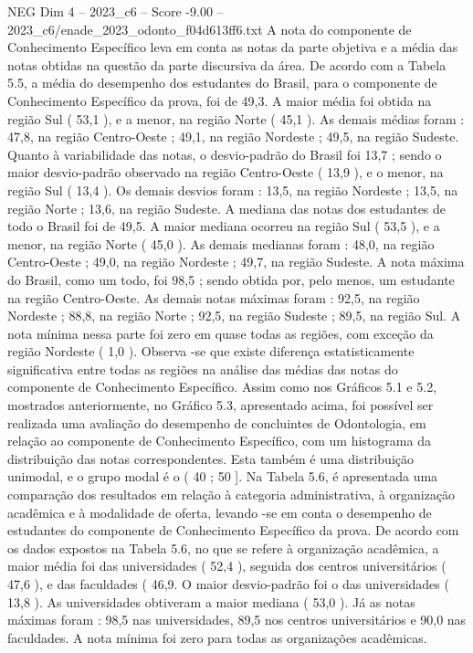 \begin{textsample}{NEG Dim 4 – 2023\_c6 – Score -9.00 – 2023\_c6/enade\_2023\_odonto\_f04d613ff6.txt}
A nota do componente de Conhecimento Específico leva em conta as notas da parte objetiva e a média das notas obtidas na questão da parte discursiva da área.
De acordo com a Tabela 5.5, a média do desempenho dos estudantes do Brasil, para o componente de Conhecimento Específico da prova, foi de 49,3.
A maior média foi obtida na região Sul ( 53,1 ), e a menor, na região Norte ( 45,1 ).
As demais médias foram : 47,8, na região Centro-Oeste ; 49,1, na região Nordeste ; 49,5, na região Sudeste.
Quanto à variabilidade das notas, o desvio-padrão do Brasil foi 13,7 ; sendo o maior desvio-padrão observado na região Centro-Oeste ( 13,9 ), e o menor, na região Sul ( 13,4 ).
Os demais desvios foram : 13,5, na região Nordeste ; 13,5, na região Norte ; 13,6, na região Sudeste.
A mediana das notas dos estudantes de todo o Brasil foi de 49,5.
A maior mediana ocorreu na região Sul ( 53,5 ), e a menor, na região Norte ( 45,0 ).
As demais medianas foram : 48,0, na região Centro-Oeste ; 49,0, na região Nordeste ; 49,7, na região Sudeste.
A nota máxima do Brasil, como um todo, foi 98,5 ; sendo obtida por, pelo menos, um estudante na região Centro-Oeste.
As demais notas máximas foram : 92,5, na região Nordeste ; 88,8, na região Norte ; 92,5, na região Sudeste ; 89,5, na região Sul.
A nota mínima nessa parte foi zero em quase todas as regiões, com exceção da região Nordeste ( 1,0 ).
Observa -se que existe diferença estatisticamente significativa entre todas as regiões na análise das médias das notas do componente de Conhecimento Específico.
Assim como nos Gráficos 5.1 e 5.2, mostrados anteriormente, no Gráfico 5.3, apresentado acima, foi possível ser realizada uma avaliação do desempenho de concluintes de Odontologia, em relação ao componente de Conhecimento Específico, com um histograma da distribuição das notas correspondentes.
Esta também é uma distribuição unimodal, e o grupo modal é o ( 40 ; 50 ].
Na Tabela 5.6, é apresentada uma comparação dos resultados em relação à categoria administrativa, à organização acadêmica e à modalidade de oferta, levando -se em conta o desempenho de estudantes do componente de Conhecimento Específico da prova.
De acordo com os dados expostos na Tabela 5.6, no que se refere à organização acadêmica, a maior média foi das universidades ( 52,4 ), seguida dos centros universitários ( 47,6 ), e das faculdades ( 46,9.
O maior desvio-padrão foi o das universidades ( 13,8 ).
As universidades obtiveram a maior mediana ( 53,0 ).
Já as notas máximas foram : 98,5 nas universidades, 89,5 nos centros universitários e 90,0 nas faculdades.
A nota mínima foi zero para todas as organizações acadêmicas.

\end{textsample}
